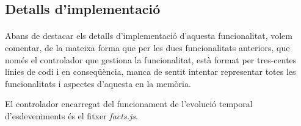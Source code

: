 \subsection{Detalls d'implementació}

    \paragraph{}
    Abans de destacar els detalls d'implementació d'aquesta funcionalitat, volem comentar, de la mateixa forma que per les dues funcionalitats anteriors, que només el controlador que gestiona la funcionalitat, està format per tres-centes línies de codi i en conseqüència, manca de sentit intentar representar totes les funcionalitats i aspectes d'aquesta en la memòria.

    El controlador encarregat del funcionament de l'evolució temporal d'esdeveniments és el fitxer \emph{facts.js}.

    
    
    
